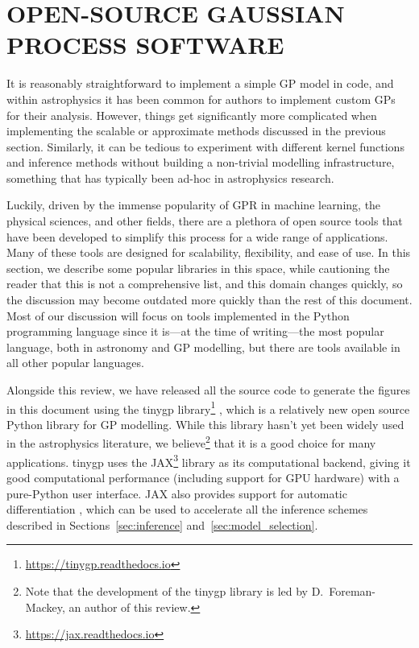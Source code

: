 \documentclass[letterpaper]{ar-1col}
\newcommand{\project}[1]{\textsf{#1}}
\begin{document}
\section{OPEN-SOURCE GAUSSIAN PROCESS SOFTWARE}
\label{sec:open}

It is reasonably straightforward to implement a simple GP model in code, and within astrophysics it has been common for authors to implement custom GPs for their analysis.
However, things get significantly more complicated when implementing the scalable or approximate methods discussed in the previous section.
Similarly, it can be tedious to experiment with different kernel functions and inference methods without building a non-trivial modelling infrastructure, something that has typically been ad-hoc in astrophysics research.

Luckily, driven by the immense popularity of GPR in machine learning, the physical sciences, and other fields, there are a plethora of open source tools that have been developed to simplify this process for a wide range of applications.
Many of these tools are designed for scalability, flexibility, and ease of use.
In this section, we describe some popular libraries in this space, while cautioning the reader that this is not a comprehensive list, and this domain changes quickly, so the discussion may become outdated more quickly than the rest of this document.
Most of our discussion will focus on tools implemented in the \project{Python} programming language since it is---at the time of writing---the most popular language, both in astronomy and GP modelling, but there are tools available in all other popular languages.

Alongside this review, we have released all the source code to generate the figures in this document using the \project{tinygp} library\footnote{\url{https://tinygp.readthedocs.io}} \citep{tinygp}, which is a relatively new open source \project{Python} library for GP modelling.
While this library hasn't yet been widely used in the astrophysics literature, we believe\footnote{Note that the development of the \project{tinygp} library is led by D.\ Foreman-Mackey, an author of this review.} that it is a good choice for many applications.
\project{tinygp} uses the \project{JAX}\footnote{\url{https://jax.readthedocs.io}} library as its computational backend, giving it good computational performance (including support for GPU hardware) with a pure-\project{Python} user interface.
\project{JAX} also provides support for automatic differentiation \citep[e.g.,][]{autodiff}, which can be used to accelerate all the inference schemes described in Sections~\ref{sec:inference} and~\ref{sec:model_selection}.
\end{document}
